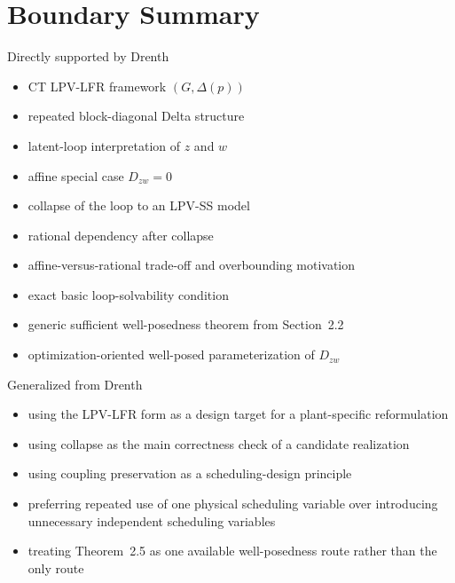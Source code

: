 \documentclass[11pt]{article}
\begin{document}
\section{Boundary Summary}

\begin{resultbox}{Directly supported by Drenth}
\begin{itemize}[leftmargin=1.2em]
    \item CT LPV-LFR framework $(G,\Delta(p))$
    \item repeated block-diagonal Delta structure
    \item latent-loop interpretation of $z$ and $w$
    \item affine special case $D_{zw}=0$
    \item collapse of the loop to an LPV-SS model
    \item rational dependency after collapse
    \item affine-versus-rational trade-off and overbounding motivation
    \item exact basic loop-solvability condition
    \item generic sufficient well-posedness theorem from Section~2.2
    \item optimization-oriented well-posed parameterization of $D_{zw}$
\end{itemize}
\end{resultbox}

\begin{resultbox}{Generalized from Drenth}
\begin{itemize}[leftmargin=1.2em]
    \item using the LPV-LFR form as a design target for a plant-specific reformulation
    \item using collapse as the main correctness check of a candidate realization
    \item using coupling preservation as a scheduling-design principle
    \item preferring repeated use of one physical scheduling variable over
    introducing unnecessary independent scheduling variables
    \item treating Theorem~2.5 as one available well-posedness route rather than
    the only route
\end{itemize}
\end{resultbox}
\end{document}
